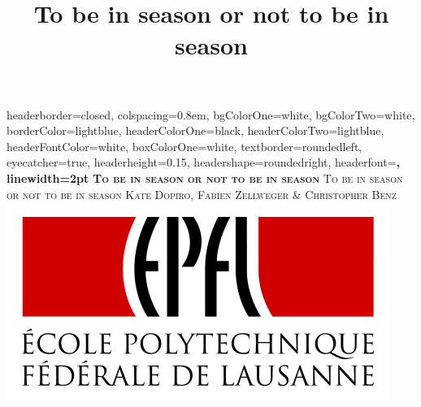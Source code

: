 \documentclass[landscape,a0paper,fontscale=0.285]{baposter} %
\title{To be in season or not to be in season}
\begin{document}
\begin{poster}
{
headerborder=closed, %
colspacing=0.8em, %
bgColorOne=white, %
bgColorTwo=white, %
borderColor=lightblue, %
headerColorOne=black, %
headerColorTwo=lightblue, %
headerFontColor=white, %
boxColorOne=white, %
textborder=roundedleft, %
eyecatcher=true, %
headerheight=0.15\textheight, %
headershape=roundedright, %
headerfont=\Large\bf\textsc, %
linewidth=2pt %
}
{\bf\textsc{To be in season or not to be in season}\vspace{0.5em}} %
{\textsc{ To be in season or not to be in season \hspace{20pt}}}
{\textsc{ Kate Dopiro, Fabien Zellweger \& Christopher Benz \\ \includegraphics[scale=0.3]{img/EPFL-Logo-RVB-55.jpg} \hspace{6pt}}} 



\end{poster}
\end{document}
